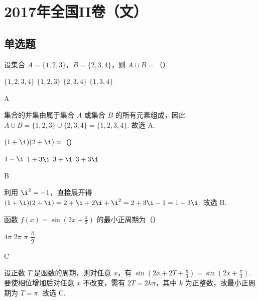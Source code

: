 \chapter{2017年全国II卷（文）}

\section{单选题}

\begin{problem}
设集合 \(A=\{1,2,3\}\)，\(B=\{2,3,4\}\)，则 \(A\cup B=\)（\quad）

\choices
    {\(\{1,2,3,4\}\)}
    {\(\{1,2,3\}\)}
    {\(\{2,3,4\}\)}
    {\(\{1,3,4\}\)}
\end{problem}

\begin{answer}
A
\end{answer}

\begin{solution}
集合的并集由属于集合 \(A\) 或集合 \(B\) 的所有元素组成，因此
\(A\cup B=\{1,2,3\}\cup\{2,3,4\}=\{1,2,3,4\}\).
故选 A.
\end{solution}

\begin{problem}
\((1+\i)(2+\i)=\)（\quad）

\choices
    {\(1-\i\)}
    {\(1+3\i\)}
    {\(3+\i\)}
    {\(3+3\i\)}
\end{problem}

\begin{answer}
B
\end{answer}

\begin{solution}
利用 \(\i^2=-1\)，直接展开得
\((1+\i)(2+\i)=2+\i+2\i+\i^2=2+3\i-1=1+3\i\).
故选 B.
\end{solution}

\begin{problem}
函数 \(f(x)=\sin\!\left(2x+\frac{\pi}{3}\right)\) 的最小正周期为（\quad）

\choices
    {\(4\pi\)}
    {\(2\pi\)}
    {\(\pi\)}
    {\(\dfrac{\pi}{2}\)}
\end{problem}

\begin{answer}
C
\end{answer}

\begin{solution}
设正数 \(T\) 是函数的周期，则对任意 \(x\)，有
\(\sin\left(2x+2T+\frac{\pi}{3}\right)=\sin\left(2x+\frac{\pi}{3}\right)\).
要使相位增加后对任意 \(x\) 不改变，需有 \(2T=2k\pi\)，其中 \(k\) 为正整数，故最小正周期为 \(T=\pi\).
故选 C.
\end{solution}

